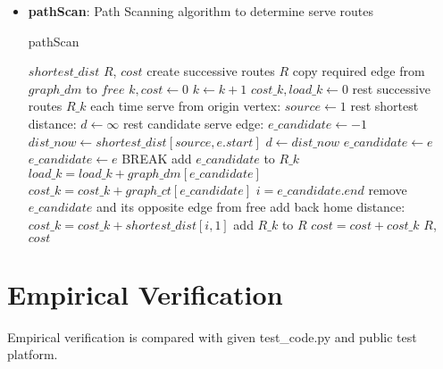 \documentclass[conference,compsoc]{IEEEtran}
\renewcommand{\algorithmicrequire}{\textbf{Input:}}
\renewcommand{\algorithmicensure}{\textbf{Output:}}
\begin{document}
\begin{itemize}
   \item \textbf{pathScan}: Path Scanning algorithm to determine serve routes
     \begin{algorithm}[H]
     \caption{pathScan}
     \begin{algorithmic}[4]
     \renewcommand{\algorithmicrequire}{\textbf{Input:}}
     \renewcommand{\algorithmicensure}{\textbf{Output:}}
     \REQUIRE $shortest\_dist$
     \ENSURE  $R$, $cost$
     \STATE create successive routes $R$
     \STATE copy required edge from $graph\_dm$ to $free$ 
     \STATE $k, cost \leftarrow 0$
       \STATE $k \leftarrow k+1$
       \STATE $cost\_k, load\_k \leftarrow 0 $
       \STATE rest successive routes $R\_k$ each time 
       \STATE serve from origin vertex: $source \leftarrow 1$
         \STATE rest shortest distance: $d \leftarrow \infty$ 
         \STATE rest candidate serve edge: $e\_candidate \leftarrow -1$
               \STATE $dist\_now \leftarrow shortest\_dist[source, e.start]$
                 \STATE $d \leftarrow dist\_now$
                 \STATE $e\_candidate \leftarrow e$
                 \STATE $e\_candidate \leftarrow e$
               \ENDIF
            \ENDIF
         \ENDFOR
            \STATE BREAK
         \ENDIF
         \STATE add $e\_candidate$ to $R\_k$
         \STATE $load\_k = load\_k + graph\_dm[e\_candidate]$
         \STATE $cost\_k = cost\_k + graph\_ct[e\_candidate]$
         \STATE $i = e\_candidate.end$
         \STATE remove $e\_candidate$ and its opposite edge from free
       \ENDWHILE
       \STATE add back home distance: $cost\_k = cost\_k + shortest\_dist[i,1]$
       \STATE add $R\_k$ to $R$
       \STATE $cost = cost + cost\_k$
     \ENDWHILE
     \RETURN $R$, $cost$
     \end{algorithmic}
     \end{algorithm}

\end{itemize}


\section{Empirical Verification}
Empirical verification is compared with given test\_code.py and public test
platform.
\end{document}

